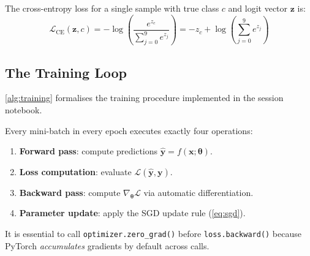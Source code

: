 \documentclass[12pt,a4paper]{article}
\begin{document}
The cross-entropy loss for a single sample with true class $c$ and logit
vector $\mathbf{z}$ is:
\begin{equation}
  \mathcal{L}_{\text{CE}}(\mathbf{z}, c) =
  -\log\!\left(\frac{e^{z_c}}{\sum_{j=0}^{9} e^{z_j}}\right)
  = -z_c + \log\!\left(\sum_{j=0}^{9} e^{z_j}\right)
  \label{eq:ce-loss}
\end{equation}

\subsection{The Training Loop}
\label{subsec:training-loop}

\cref{alg:training} formalises the training procedure implemented in the
session notebook.

\begin{algorithm}[H]
\caption{Mini-Batch Training Loop for Fashion-MNIST ANN}
\label{alg:training}
\SetAlgoLined
{}

\end{algorithm}

\begin{keyinsight}[title=The Four Steps of a Training Iteration]
Every mini-batch in every epoch executes exactly four operations:
\begin{enumerate}[label=\arabic*.]
  \item \textbf{Forward pass}: compute predictions $\hat{\mathbf{y}} = f(\mathbf{x}; \boldsymbol{\theta})$.
  \item \textbf{Loss computation}: evaluate $\mathcal{L}(\hat{\mathbf{y}}, \mathbf{y})$.
  \item \textbf{Backward pass}: compute $\nabla_{\boldsymbol{\theta}} \mathcal{L}$ via automatic differentiation.
  \item \textbf{Parameter update}: apply the SGD update rule (\cref{eq:sgd}).
\end{enumerate}
It is essential to call \texttt{optimizer.zero\_grad()} before
\texttt{loss.backward()} because PyTorch \emph{accumulates} gradients by
default across calls.
\end{keyinsight}
\end{document}
